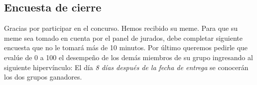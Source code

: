 \subsection{Encuesta de cierre}
Gracias por participar en el concurso. 
Hemos recibido su meme. Para que su meme sea tomado en cuenta por el panel de jurados, debe completar siguiente encuesta que no le tomará más de 10 minutos.  
Por último queremos pedirle que evalúe de 0 a 100 el desempeño de los demás miembros de su grupo ingresando al siguiente hipervínculo: 
El día \textit{8 días después de la fecha de entrega} se conocerán los dos grupos ganadores.




















